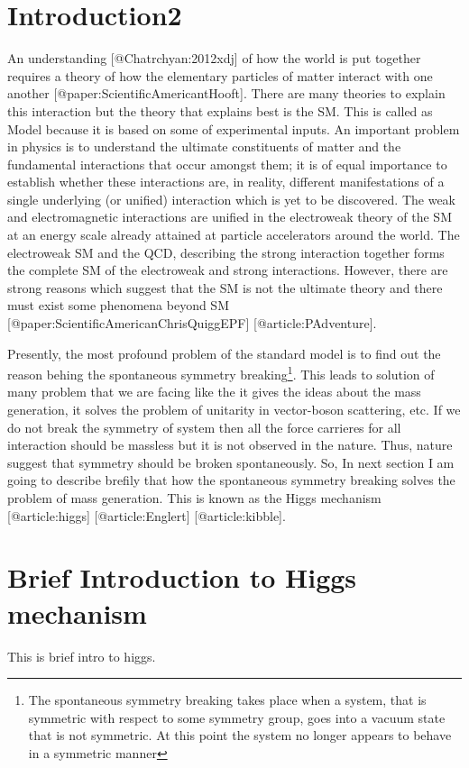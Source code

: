 \section{Introduction2}
An understanding [@Chatrchyan:2012xdj] of how the world is put together requires a theory of how the elementary particles of matter interact with one another [@paper:ScientificAmericantHooft]. There are many theories to explain this interaction but the theory that explains best is the SM. This is called as Model because it is based on some of experimental inputs. An important problem in physics is to understand the ultimate constituents of matter and the fundamental interactions that occur amongst them; it is of equal importance to establish whether these interactions are, in reality, different manifestations of a single underlying (or unified) interaction which is yet to be discovered. The weak and electromagnetic interactions are unified in the electroweak theory of the SM at an energy scale already attained at particle accelerators around the world. The electroweak SM and the QCD, describing the strong interaction together forms the complete SM of the electroweak and strong interactions. However, there are strong reasons which suggest that the SM is not the ultimate theory and there must exist some phenomena beyond SM [@paper:ScientificAmericanChrisQuiggEPF] [@article:PAdventure].  

Presently, the most profound problem of the standard model is to find out the reason behing the spontaneous symmetry breaking\footnote{The spontaneous symmetry breaking takes place when a system, that is symmetric with respect to some symmetry group, goes into a vacuum state that is not symmetric. At this point the system no longer appears to behave in a symmetric manner}. This leads to solution of many problem that we are facing like the it gives the ideas about the mass generation, it solves the problem of unitarity in vector-boson scattering, etc. If we do not break the symmetry of system then all the force carrieres for all interaction should be massless but it is not observed in the nature. Thus, nature suggest that symmetry should be broken spontaneously. So, In next section I am going to describe brefily that how the spontaneous symmetry breaking solves the problem of mass generation. This is known as the Higgs mechanism [@article:higgs] [@article:Englert] [@article:kibble].

\section{Brief Introduction to Higgs mechanism}
This is brief intro to higgs.

